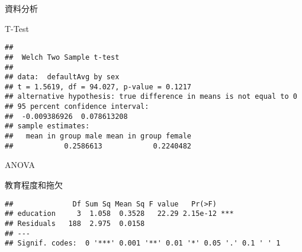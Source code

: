 \documentclass[ignorenonframetext,]{beamer}
\newenvironment{Shaded}{\begin{snugshade}}{\end{snugshade}}
\newcommand{\KeywordTok}[1]{\textcolor[rgb]{0.13,0.29,0.53}{\textbf{#1}}}
\newcommand{\DataTypeTok}[1]{\textcolor[rgb]{0.13,0.29,0.53}{#1}}
\newcommand{\StringTok}[1]{\textcolor[rgb]{0.31,0.60,0.02}{#1}}
\newcommand{\OperatorTok}[1]{\textcolor[rgb]{0.81,0.36,0.00}{\textbf{#1}}}
\newcommand{\NormalTok}[1]{#1}
\begin{document}
\begin{frame}[fragile]{資料分析}

\begin{block}{T-Test}

\begin{Shaded}
\end{Shaded}

\begin{verbatim}
## 
##  Welch Two Sample t-test
## 
## data:  defaultAvg by sex
## t = 1.5619, df = 94.027, p-value = 0.1217
## alternative hypothesis: true difference in means is not equal to 0
## 95 percent confidence interval:
##  -0.009386926  0.078613208
## sample estimates:
##   mean in group male mean in group female 
##            0.2586613            0.2240482
\end{verbatim}

\end{block}

\begin{block}{ANOVA}

\begin{block}{教育程度和拖欠}

\begin{Shaded}
\end{Shaded}

\begin{verbatim}
##              Df Sum Sq Mean Sq F value   Pr(>F)    
## education     3  1.058  0.3528   22.29 2.15e-12 ***
## Residuals   188  2.975  0.0158                     
## ---
## Signif. codes:  0 '***' 0.001 '**' 0.01 '*' 0.05 '.' 0.1 ' ' 1
\end{verbatim}


\end{block}
\end{block}
\end{frame}
\end{document}
